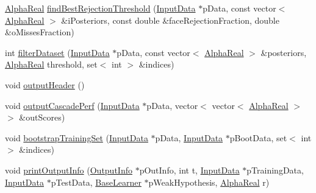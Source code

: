 \begin{DoxyCompactItemize}
\item 
\hyperlink{Defaults_8h_a80184c4fd10ab70a1a17c5f97dcd1563}{Alpha\-Real} \hyperlink{classMultiBoost_1_1SoftCascadeLearner_a462e01727faa308a58e08466dc1390c0}{find\-Best\-Rejection\-Threshold} (\hyperlink{classMultiBoost_1_1InputData}{Input\-Data} $\ast$p\-Data, const vector$<$ \hyperlink{Defaults_8h_a80184c4fd10ab70a1a17c5f97dcd1563}{Alpha\-Real} $>$ \&i\-Posteriors, const double \&face\-Rejection\-Fraction, double \&o\-Misses\-Fraction)
\item 
int \hyperlink{classMultiBoost_1_1SoftCascadeLearner_a52861e2d754a14d4fd4ce4243160d04d}{filter\-Dataset} (\hyperlink{classMultiBoost_1_1InputData}{Input\-Data} $\ast$p\-Data, const vector$<$ \hyperlink{Defaults_8h_a80184c4fd10ab70a1a17c5f97dcd1563}{Alpha\-Real} $>$ \&posteriors, \hyperlink{Defaults_8h_a80184c4fd10ab70a1a17c5f97dcd1563}{Alpha\-Real} threshold, set$<$ int $>$ \&indices)
\item 
void \hyperlink{classMultiBoost_1_1SoftCascadeLearner_a3bc1102b9faef5b1177e9ef051cf5f0a}{output\-Header} ()
\item 
void \hyperlink{classMultiBoost_1_1SoftCascadeLearner_a4b44c437226197355a69f92e862755af}{output\-Cascade\-Perf} (\hyperlink{classMultiBoost_1_1InputData}{Input\-Data} $\ast$p\-Data, vector$<$ vector$<$ \hyperlink{Defaults_8h_a80184c4fd10ab70a1a17c5f97dcd1563}{Alpha\-Real} $>$ $>$ \&out\-Scores)
\item 
void \hyperlink{classMultiBoost_1_1SoftCascadeLearner_a22318a7cfbb16b7e6f26991bf2c0886f}{bootstrap\-Training\-Set} (\hyperlink{classMultiBoost_1_1InputData}{Input\-Data} $\ast$p\-Data, \hyperlink{classMultiBoost_1_1InputData}{Input\-Data} $\ast$p\-Boot\-Data, set$<$ int $>$ \&indices)
\item 
void \hyperlink{classMultiBoost_1_1SoftCascadeLearner_a42f5daa3ec9d2b00e72c8c4eeff04237}{print\-Output\-Info} (\hyperlink{classMultiBoost_1_1OutputInfo}{Output\-Info} $\ast$p\-Out\-Info, int t, \hyperlink{classMultiBoost_1_1InputData}{Input\-Data} $\ast$p\-Training\-Data, \hyperlink{classMultiBoost_1_1InputData}{Input\-Data} $\ast$p\-Test\-Data, \hyperlink{classMultiBoost_1_1BaseLearner}{Base\-Learner} $\ast$p\-Weak\-Hypothesis, \hyperlink{Defaults_8h_a80184c4fd10ab70a1a17c5f97dcd1563}{Alpha\-Real} r)
\end{DoxyCompactItemize}
